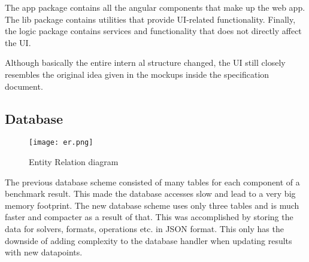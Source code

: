 The app package contains all the angular components that make up the web app. The lib package contains utilities that provide UI-related functionality. Finally, the logic package contains services and functionality that does not directly affect the UI.

Although basically the entire intern al structure changed, the UI still closely resembles the original idea given in the mockups inside the specification document.


\subsection{Database}

\begin{figure}[H]
	\centering
	\texttt{[image: er.png]}
	\caption{Entity Relation diagram}
  \label{fig:er}
\end{figure}

The previous database scheme consisted of many tables for each component of a benchmark result. This made the database accesses slow and lead to a very big memory footprint. The new database scheme uses only three tables and is much faster and compacter as a result of that. This was accomplished by storing the data for solvers, formats, operations etc. in JSON format. This only has the downside of adding complexity to the database handler when updating results with new datapoints.
